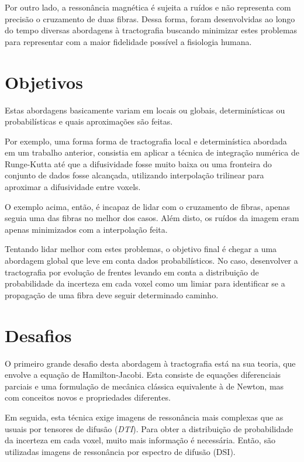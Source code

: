 \documentclass[a4paper,11pt]{report}
\begin{document}
  Por outro lado, a ressonância magnética é sujeita a ruídos e não representa com precisão o cruzamento de duas fibras. Dessa forma, foram desenvolvidas ao longo do tempo diversas abordagens à tractografia buscando minimizar estes problemas para representar com a maior fidelidade possível a fisiologia humana.
  
  \section{Objetivos}
  Estas abordagens basicamente variam em locais ou globais, determinísticas ou probabilísticas e quais aproximações são feitas. 
  
  Por exemplo, uma forma forma de tractografia local e determinística abordada em um trabalho anterior, consistia em aplicar a técnica de integração numérica de Runge-Kutta até que a difusividade fosse muito baixa ou uma fronteira do conjunto de dados fosse alcançada, utilizando interpolação trilinear para aproximar a difusividade entre voxels.
  
  O exemplo acima, então, é incapaz de lidar com o cruzamento de fibras, apenas seguia uma das fibras no melhor dos casos. Além disto, os ruídos da imagem eram apenas minimizados com a interpolação feita.
  
  Tentando lidar melhor com estes problemas, o objetivo final é chegar a uma abordagem global que leve em conta dados probabilísticos. No caso, desenvolver a tractografia por evolução de frentes levando em conta a distribuição de probabilidade da incerteza em cada voxel como um limiar para identificar se a propagação de uma fibra deve seguir determinado caminho.
  
  \section{Desafios}
  O primeiro grande desafio desta abordagem à tractografia está na sua teoria, que envolve a equação de Hamilton-Jacobi. Esta consiste de equações diferenciais parciais e uma formulação de mecânica clássica equivalente à de Newton, mas com conceitos novos e propriedades diferentes.
  
  Em seguida, esta técnica exige imagens de ressonância mais complexas que as usuais por tensores de difusão (\textit{DTI}). Para obter a distribuição de probabilidade da incerteza em cada voxel, muito mais informação é necessária. Então, são utilizadas imagens de ressonância por espectro de difusão (DSI).
  
\end{document}
